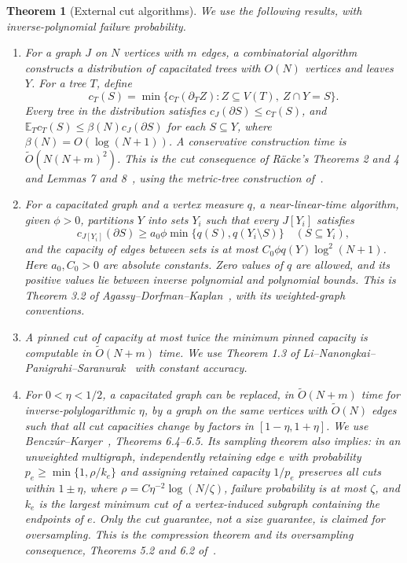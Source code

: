 \documentclass[11pt]{article}
\newtheorem{theorem}{Theorem}[section]
\theoremstyle{definition}
\newcommand{\E}{\mathbb E}
\newcommand{\wt}{\widetilde}
\newcommand{\cut}{\partial}
\begin{document}
\begin{theorem}[External cut algorithms]\label{thm:external}
We use the following results, with inverse-polynomial failure probability.
\begin{enumerate}[label=(\alph*)]
\item \label{ext:tree}
For a graph $J$ on $N$ vertices with $m$ edges, a combinatorial algorithm
constructs a distribution of capacitated trees with $O(N)$ vertices and
leaves $Y$. For a tree $T$, define
\[
 c_T(S)=\min\{c_T(\cut_T Z):Z\subseteq V(T),\ Z\cap Y=S\}.
\]
Every tree in the distribution satisfies $c_J(\cut S)\le c_T(S)$, and
$\E_Tc_T(S)\le\beta(N)c_J(\cut S)$ for each $S\subseteq Y$, where
$\beta(N)=O(\log(N+1))$. A conservative construction time is
$\wt O(N(N+m)^2)$. This is the cut consequence of R\"acke's
Theorems 2 and 4 and Lemmas 7 and 8~\cite{Racke08}, using
the metric-tree construction of~\cite{FRT04}.
\item \label{ext:ed}
For a capacitated graph and a vertex measure $q$, a near-linear-time
algorithm, given $\phi>0$, partitions $Y$ into sets $Y_i$ such that
every $J[Y_i]$ satisfies
\[
 c_{J[Y_i]}(\cut S)\ge a_0\phi\min\{q(S),q(Y_i\setminus S)\}
 \quad(S\subseteq Y_i),
\]
and the capacity of edges between sets is at most
$C_0\phi q(Y)\log^2(N+1)$. Here $a_0,C_0>0$ are absolute constants.
Zero values of $q$ are allowed, and its positive values lie between inverse
polynomial and polynomial bounds. This is Theorem 3.2
of Agassy--Dorfman--Kaplan~\cite{ADK25}, with its weighted-graph conventions.
\item \label{ext:st}
A pinned cut of capacity at most twice the minimum pinned capacity is
computable in $\wt O(N+m)$ time. We use Theorem 1.3
of Li--Nanongkai--Panigrahi--Saranurak~\cite{LNPS23} with constant accuracy.
\item \label{ext:bk}
For $0<\eta<1/2$, a capacitated graph can be replaced, in
$\wt O(N+m)$ time for inverse-polylogarithmic $\eta$, by a graph on the same
vertices with $\wt O(N)$ edges such that all cut capacities change by factors
in $[1-\eta,1+\eta]$. We use Bencz\'ur--Karger~\cite{BK15},
Theorems 6.4--6.5. Its sampling theorem also implies: in an unweighted
multigraph, independently retaining edge $e$ with probability
$p_e\ge\min\{1,\rho/k_e\}$ and assigning retained capacity $1/p_e$
preserves all cuts within $1\pm\eta$, where
$\rho=C\eta^{-2}\log(N/\zeta)$, failure probability is at most $\zeta$,
and $k_e$ is the largest minimum cut of a vertex-induced subgraph containing
the endpoints of $e$. Only the cut guarantee, not a size guarantee, is
claimed for oversampling. This is the compression theorem and its
oversampling consequence, Theorems 5.2 and 6.2 of~\cite{BK15}.
\end{enumerate}
\end{theorem}
\end{document}
